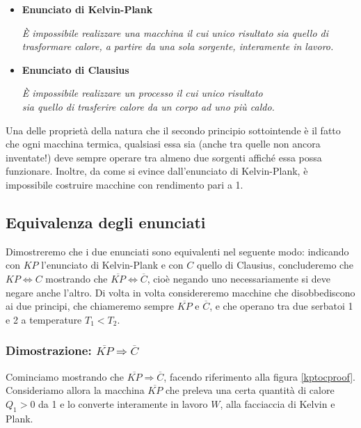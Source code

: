 \begin{tcolorbox}[colback = red!30, colframe = red!30!black, title = {Enunciati del secondo principio della termodinamica}]
    \begin{itemize}
        \item \textbf{Enunciato di Kelvin-Plank}
        
        \begin{center}
            \textit{È impossibile realizzare una macchina il cui unico risultato
            sia quello di trasformare calore, a partire da una sola sorgente, interamente in lavoro.}
        \end{center}
    
        \item \textbf{Enunciato di Clausius}
        
        \begin{center}
            \textit{È impossibile realizzare un processo il cui unico risultato\\
            sia quello di trasferire calore da un corpo ad uno più caldo.}
        \end{center}
    \end{itemize}
\end{tcolorbox}

\noindent Una delle proprietà della natura che il secondo principio sottointende
è il fatto che ogni macchina termica, qualsiasi essa sia (anche tra quelle non ancora
inventate!) deve sempre operare tra almeno due sorgenti affiché essa possa
funzionare. Inoltre, da come si evince dall'enunciato di Kelvin-Plank, è impossibile
costruire macchine con rendimento pari a 1.

\subsection{Equivalenza degli enunciati}
Dimostreremo che i due enunciati sono equivalenti nel seguente modo:
indicando con $KP$ l'enunciato di Kelvin-Plank e con $C$ quello di
Clausius, concluderemo che $KP \Leftrightarrow C$ mostrando che
$\overline{KP} \Leftrightarrow \overline{C}$, cioè negando uno necessariamente
si deve negare anche l'altro. Di volta in volta
considereremo macchine che disobbediscono ai due principi, che chiameremo
sempre $\overline{KP}$ e $\overline{C}$, e che operano tra due
serbatoi 1 e 2 a temperature $T_1 < T_2$.

\subsubsection*{Dimostrazione: $\overline{KP} \Rightarrow \overline{C}$}
Cominciamo mostrando che $\overline{KP} \Rightarrow \overline{C}$,
facendo riferimento alla figura \ref{kptocproof}.
Consideriamo allora la macchina $\overline{KP}$ che preleva una
certa quantità di calore $Q_1 > 0$ da 1 e lo converte interamente
in lavoro $W$, alla facciaccia di Kelvin e Plank.

